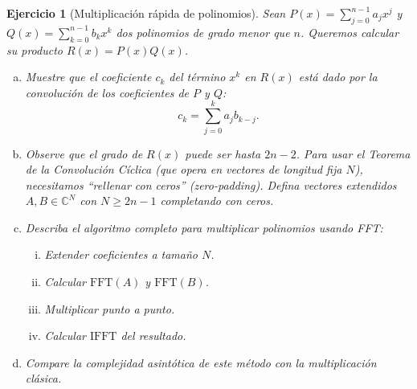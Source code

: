 \documentclass[12pt]{article}
\newtheorem{exercise}{Ejercicio}
\begin{document}
\begin{exercise}[Multiplicación rápida de polinomios]
Sean $P(x) = \sum_{j=0}^{n-1} a_j x^j$ y $Q(x) = \sum_{k=0}^{n-1} b_k x^k$ dos polinomios de grado menor que $n$. Queremos calcular su producto $R(x) = P(x)Q(x)$.
\begin{enumerate}[(a)]
\item Muestre que el coeficiente $c_k$ del término $x^k$ en $R(x)$ está dado por la convolución de los coeficientes de $P$ y $Q$:
\[
c_k = \sum_{j=0}^k a_j b_{k-j}.
\]
\item Observe que el grado de $R(x)$ puede ser hasta $2n-2$. Para usar el Teorema de la Convolución Cíclica (que opera en vectores de longitud fija $N$), necesitamos ``rellenar con ceros'' (zero-padding).
Defina vectores extendidos $A, B \in \mathbb{C}^N$ con $N \ge 2n-1$ completando con ceros.
\item Describa el algoritmo completo para multiplicar polinomios usando FFT:
   \begin{enumerate}[i.]
   \item Extender coeficientes a tamaño $N$.
   \item Calcular $\text{FFT}(A)$ y $\text{FFT}(B)$.
   \item Multiplicar punto a punto.
   \item Calcular $\text{IFFT}$ del resultado.
   \end{enumerate}
\item Compare la complejidad asintótica de este método con la multiplicación clásica.
\end{enumerate}
\end{exercise}
\end{document}
